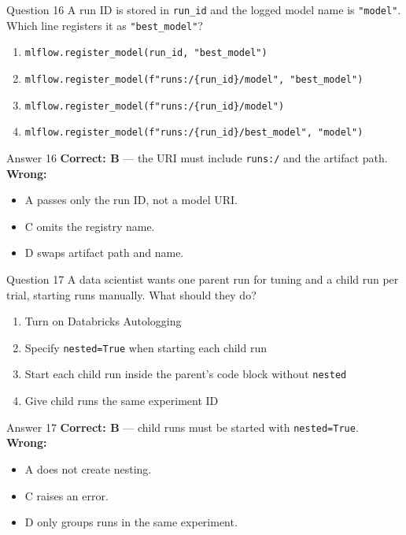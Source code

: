 \documentclass[aspectratio=169,11pt]{beamer}
\begin{document}
	\begin{frame}{Question 16}
		A run ID is stored in \texttt{run\_id} and the logged model name is \texttt{"model"}. Which line registers it as \texttt{"best\_model"}?
		\begin{enumerate}[label=\Alph*.]
			\item \texttt{mlflow.register\_model(run\_id, "best\_model")}
			\item \texttt{mlflow.register\_model(f"runs:/\{run\_id\}/model", "best\_model")}
			\item \texttt{mlflow.register\_model(f"runs:/\{run\_id\}/model")}
			\item \texttt{mlflow.register\_model(f"runs:/\{run\_id\}/best\_model", "model")}
		\end{enumerate}
	\end{frame}
	\begin{frame}{Answer 16}
		\textbf{Correct: B} --- the URI must include \texttt{runs:/} and the artifact path.\\
		\vspace{0.5em}
		\textbf{Wrong:}
		\begin{itemize}
			\item A passes only the run ID, not a model URI.
			\item C omits the registry name.
			\item D swaps artifact path and name.
		\end{itemize}
	\end{frame}
	
	\begin{frame}{Question 17}
		A data scientist wants one parent run for tuning and a child run per trial, starting runs manually. What should they do?
		\begin{enumerate}[label=\Alph*.]
			\item Turn on Databricks Autologging
			\item Specify \texttt{nested=True} when starting each child run
			\item Start each child run inside the parent's code block without \texttt{nested}
			\item Give child runs the same experiment ID
		\end{enumerate}
	\end{frame}
	\begin{frame}{Answer 17}
		\textbf{Correct: B} --- child runs must be started with \texttt{nested=True}.\\
		\vspace{0.5em}
		\textbf{Wrong:}
		\begin{itemize}
			\item A does not create nesting.
			\item C raises an error.
			\item D only groups runs in the same experiment.
		\end{itemize}
	\end{frame}
	
\end{document}
